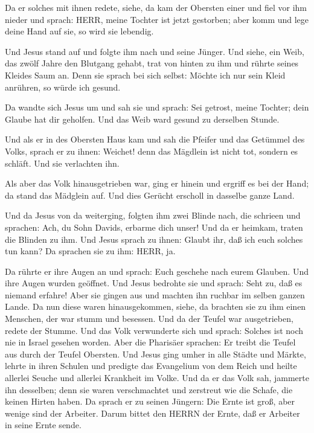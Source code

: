  Da er solches mit ihnen redete, siehe, da kam der Obersten
einer und fiel vor ihm nieder und sprach: HERR, meine Tochter ist jetzt
gestorben; aber komm und lege deine Hand auf sie, so wird sie lebendig.

 Und Jesus stand auf und folgte ihm nach und seine Jünger.
 Und siehe, ein Weib, das zwölf Jahre den Blutgang gehabt,
trat von hinten zu ihm und rührte seines Kleides Saum an. 
Denn sie sprach bei sich selbst: Möchte ich nur sein Kleid anrühren, so
würde ich gesund.

 Da wandte sich Jesus um und sah sie und sprach: Sei
getrost, meine Tochter; dein Glaube hat dir geholfen. Und das Weib ward
gesund zu derselben Stunde.

 Und als er in des Obersten Haus kam und sah die Pfeifer
und das Getümmel des Volks,  sprach er zu ihnen: Weichet!
denn das Mägdlein ist nicht tot, sondern es schläft. Und sie verlachten
ihn.

 Als aber das Volk hinausgetrieben war, ging er hinein und
ergriff es bei der Hand; da stand das Mädglein auf.  Und
dies Gerücht erscholl in dasselbe ganze Land.

 Und da Jesus von da weiterging, folgten ihm zwei Blinde
nach, die schrieen und sprachen: Ach, du Sohn Davids, erbarme dich
unser!  Und da er heimkam, traten die Blinden zu ihm. Und
Jesus sprach zu ihnen: Glaubt ihr, daß ich euch solches tun kann? Da
sprachen sie zu ihm: HERR, ja.

 Da rührte er ihre Augen an und sprach: Euch geschehe nach
eurem Glauben.  Und ihre Augen wurden geöffnet. Und Jesus
bedrohte sie und sprach: Seht zu, daß es niemand erfahre! 
Aber sie gingen aus und machten ihn ruchbar im selben ganzen Lande.
 Da nun diese waren hinausgekommen, siehe, da brachten sie
zu ihm einen Menschen, der war stumm und besessen.  Und da
der Teufel war ausgetrieben, redete der Stumme. Und das Volk verwunderte
sich und sprach: Solches ist noch nie in Israel gesehen worden.
 Aber die Pharisäer sprachen: Er treibt die Teufel aus
durch der Teufel Obersten.  Und Jesus ging umher in alle
Städte und Märkte, lehrte in ihren Schulen und predigte das Evangelium
von dem Reich und heilte allerlei Seuche und allerlei Krankheit im
Volke.  Und da er das Volk sah, jammerte ihn desselben;
denn sie waren verschmachtet und zerstreut wie die Schafe, die keinen
Hirten haben.  Da sprach er zu seinen Jüngern: Die Ernte
ist groß, aber wenige sind der Arbeiter.  Darum bittet den
HERRN der Ernte, daß er Arbeiter in seine Ernte sende.


